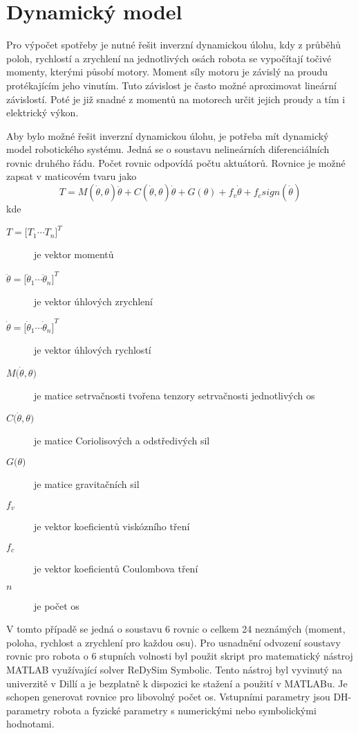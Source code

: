 

\chapter{Dynamický model}

Pro výpočet spotřeby je nutné řešit inverzní dynamickou úlohu, kdy z průběhů poloh, rychlostí a zrychlení na jednotlivých osách robota se vypočítají točivé momenty, kterými působí motory. Moment síly motoru je závislý na proudu protékajícím jeho vinutím. Tuto závislost je často možné aproximovat lineární závislostí. Poté je již snadné z momentů na motorech určit jejich proudy a tím i elektrický výkon.

Aby bylo možné řešit inverzní dynamickou úlohu, je potřeba mít dynamický model robotického systému. Jedná se o soustavu nelineárních diferenciálních rovnic druhého řádu. Počet rovnic odpovídá počtu aktuátorů. Rovnice je možné zapsat v maticovém tvaru jako
\begin{equation}
T = M(\dot{\theta},\theta)\ddot{\theta} + C(\dot{\theta},\theta)\dot{\theta} + G(\theta) + f_v\dot{\theta} + f_csign(\dot{\theta})
\label{dyn_rovnice_eq}
\end{equation}
kde
\begin{description}
\item[$T = {\big[T_1  \dotsm  T_n\big]}^{T}$] je vektor momentů 
\item[$\ddot \theta = {\big[\ddot \theta_1  \dotsm  \ddot \theta_n\big]}^{T}$] je vektor úhlových zrychlení
\item[$\dot \theta = {\big[\dot \theta_1  \dotsm  \dot \theta_n\big]}^{T}$] je vektor úhlových rychlostí
\item[$M\big(\dot \theta, \theta\big)$] je matice setrvačnosti tvořena tenzory setrvačnosti jednotlivých os
\item[$C\big(\dot \theta, \theta\big)$] je matice Coriolisových a odstředivých sil
\item[$G\big(\theta\big)$] je matice gravitačních sil
\item[$f_v$] je vektor koeficientů viskózního tření
\item[$f_c$] je vektor koeficientů Coulombova tření 
\item[$n$] je počet os
\end{description}

V tomto případě se jedná o soustavu 6 rovnic o celkem 24 neznámých (moment, poloha, rychlost a zrychlení pro každou osu). Pro usnadnění odvození soustavy rovnic pro robota o 6 stupních volnosti byl použit skript pro matematický nástroj MATLAB využívající solver ReDySim Symbolic\cite{redysim}. Tento nástroj byl vyvinutý na univerzitě v Dillí a je bezplatně k dispozici ke stažení a použití v MATLABu. Je schopen generovat rovnice pro libovolný počet os. Vstupními parametry jsou DH-parametry robota a fyzické parametry s numerickými nebo symbolickými hodnotami. 


